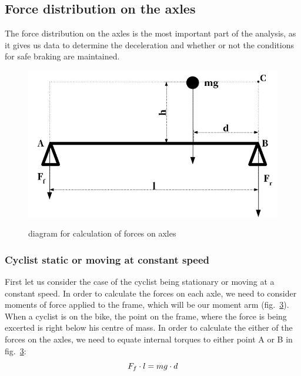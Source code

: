 \documentclass[12pt]{article}
\begin{document}
\begin{figure}[h]
\begin{subfigure}[b]{0.4\linewidth}
\caption{}%
\label{fig:beam_diagram}
\end{subfigure}%
\label{fig:theoretical_models}
\end{figure}

\newpage

\subsection{Force distribution on the axles}
The force distribution on the axles is the most important part of the analysis, as it gives us data to 
determine the deceleration and whether or not the conditions for safe braking are maintained.
\begin{figure}[H]
\caption{diagram for calculation of forces on axles}
\includegraphics[width=\linewidth]{static_forces_simplified}%
\label{fig:static_diagram}
\end{figure}

\subsubsection{Cyclist static or moving at constant speed}
First let us consider the case of the cyclist being stationary or moving at a constant speed. In order to 
calculate the forces on each axle, we need to consider moments of force applied to the frame, which will be
our moment arm (fig.~\ref{fig:static_diagram}). When a cyclist is on the bike, the point on the frame, where
the force is being excerted is right below his centre of mass. In order to calculate the either of the forces 
on the axles, we need to equate internal torques to either point A or B in fig.~\ref{fig:static_diagram}: 
\begin{equation}
\centering%
\label{eq:equating_torques}
F_f \cdot l = mg \cdot d
\end{equation}
\end{document}
